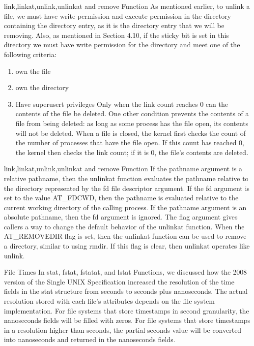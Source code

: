 \documentclass{beamer}
\begin{document}
\begin{frame}[t]{link,linkat,unlink,unlinkat and remove Function}
As mentioned earlier, to unlink a file, we must have write permission and execute
permission in the directory containing the directory entry, as it is the directory entry
that we will be removing. Also, as mentioned in Section 4.10, if the sticky bit is set in
this directory we must have write permission for the directory and meet one of the
following criteria:
\begin{enumerate}
	\item  own the file
	\item own the directory
	\item Have superusert privileges
	Only when the link count reaches 0 can the contents of the file be deleted. One
	other condition prevents the contents of a file from being deleted: as long as some
	process has the file open, its contents will not be deleted. When a file is closed, the
	kernel first checks the count of the number of processes that have the file open. If this
	count has reached 0, the kernel then checks the link count; if it is 0, the file’s contents are
	deleted.
\end{enumerate}



\end{frame}
\begin{frame}[t]{link,linkat,unlink,unlinkat and remove Function}
If the pathname argument is a relative pathname, then the unlinkat function
evaluates the pathname relative to the directory represented by the fd file descriptor
argument. If the fd argument is set to the value AT\_FDCWD, then the pathname is
evaluated relative to the current working directory of the calling process. If the
pathname argument is an absolute pathname, then the fd argument is ignored.
The flag argument gives callers a way to change the default behavior of the
unlinkat function. When the AT\_REMOVEDIR flag is set, then the unlinkat function
can be used to remove a directory, similar to using rmdir. If this flag is clear, then
unlinkat operates like unlink.
\end{frame}
\begin{frame}[t]{File Times}
In stat, fstat, fstatat, and lstat Functions, we discussed how the 2008 version of the Single UNIX Specification
increased the resolution of the time fields in the stat structure from seconds to seconds
plus nanoseconds. The actual resolution stored with each file’s attributes depends on
the file system implementation. For file systems that store timestamps in second
granularity, the nanoseconds fields will be filled with zeros. For file systems that store
timestamps in a resolution higher than seconds, the partial seconds value will be
converted into nanoseconds and returned in the nanoseconds fields.


\end{frame}
\end{document}
